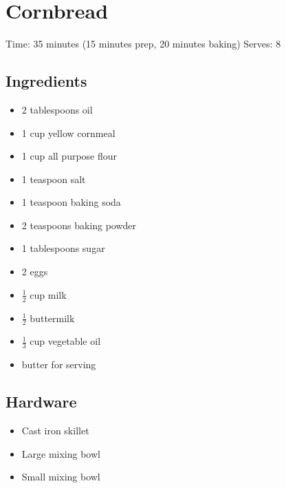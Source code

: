 \section{Cornbread}
\label{cornbread}
\setcounter{secnumdepth}{0}
Time: 35 minutes (15 minutes prep, 20 minutes baking)
Serves: 8

\begin{multicols}{2}
\subsection*{Ingredients}
\begin{itemize}
    \item 2 tablespoons oil
    \item 1 cup yellow cornmeal
    \item 1 cup all purpose flour
    \item 1 teaspoon salt
    \item 1 teaspoon baking soda
    \item 2 teaspoons baking powder
    \item 1 tablespoons sugar
    \item 2 eggs
    \item \( \frac{1}{2} \) cup milk
    \item \( \frac{1}{2} \) buttermilk
    \item \( \frac{1}{3} \) cup vegetable oil
    \item butter for serving
\end{itemize}

\subsection*{Hardware}
\begin{itemize}
    \item Cast iron skillet
    \item Large mixing bowl
    \item Small mixing bowl
\end{itemize}
\clearpage


\end{multicols}
